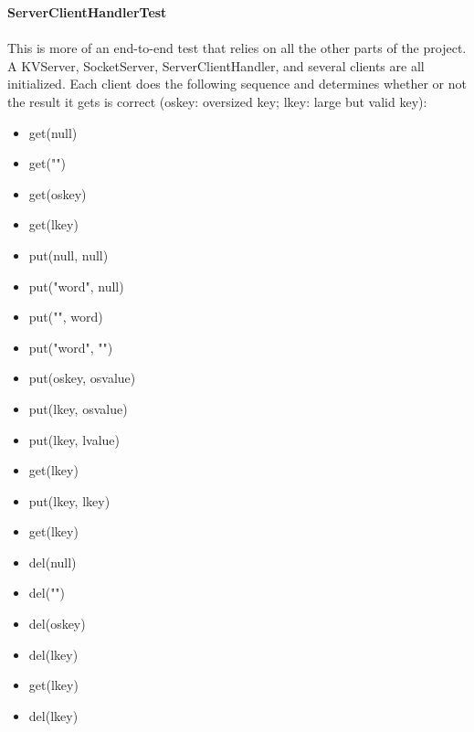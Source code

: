 \textbf{ServerClientHandlerTest} \\\\
This is more of an end-to-end test that relies on all the other parts of the project. A KVServer, SocketServer, ServerClientHandler, and several clients are all initialized. Each client does the following sequence and determines whether or not the result it gets is correct (oskey: oversized key; lkey: large but valid key):
\begin{itemize}
\item get(null)
\item get("")
\item get(oskey)
\item get(lkey)
\item put(null, null)
\item put("word", null)
\item put("", word)
\item put("word", "")
\item put(oskey, osvalue)
\item put(lkey, osvalue)
\item put(lkey, lvalue)
\item get(lkey)
\item put(lkey, lkey)
\item get(lkey)
\item del(null)
\item del("")
\item del(oskey)
\item del(lkey)
\item get(lkey)
\item del(lkey)
\end{itemize}
